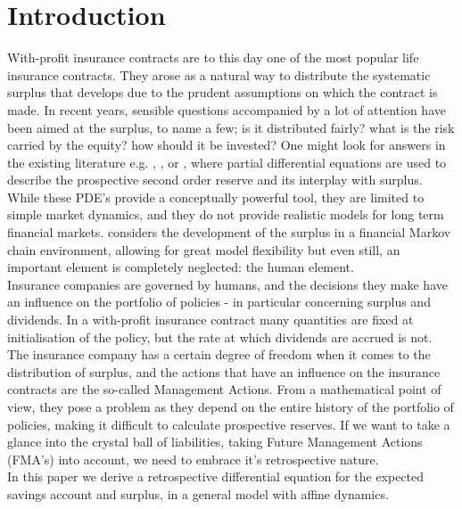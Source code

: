 \documentclass[12pt]{article}
\theoremstyle{my_thm}
\begin{document}
\section{Introduction}
With-profit insurance contracts are to this day one of the most popular life insurance contracts. They arose as a natural way to distribute the systematic surplus that develops due to the prudent assumptions on which the contract is made. In recent years, sensible questions accompanied by a lot of attention have been aimed at the surplus, to name a few; is it distributed fairly? what is the risk carried by the equity? how should it be invested? One might look for answers in the existing literature e.g. \citet{Liv2}, \citet{NorbergB}, \citet{Steffensen0} or \citet{Steffensen1}, where partial differential equations are used to describe the prospective second order reserve and its interplay with surplus. While these PDE's provide a conceptually powerful tool, they are limited to simple market dynamics, and they do not provide realistic models for long term financial markets. \citet{NorbergB} considers the development of the surplus in a financial Markov chain environment, allowing for great model flexibility but even still, an important element is completely neglected: the human element.
\\[12pt]
Insurance companies are governed by humans, and the decisions they make have an influence on the portfolio of policies - in particular concerning surplus and dividends. In a with-profit insurance contract many quantities are fixed at initialisation of the policy, but the rate at which dividends are accrued is not. The insurance company has a certain degree of freedom when it comes to the distribution of surplus, and the actions that have an influence on the insurance contracts are the so-called Management Actions.
From a mathematical point of view, they pose a problem as they depend on the entire history of the portfolio of policies, making it difficult to calculate prospective reserves. If we want to take a glance into the crystal ball of liabilities, taking Future Management Actions (FMA's) into account, we need to embrace it's retrospective nature.
\\[12pt]
In this paper we derive a retrospective differential equation for the expected savings account and surplus, in a general model with affine dynamics.  
\end{document}
